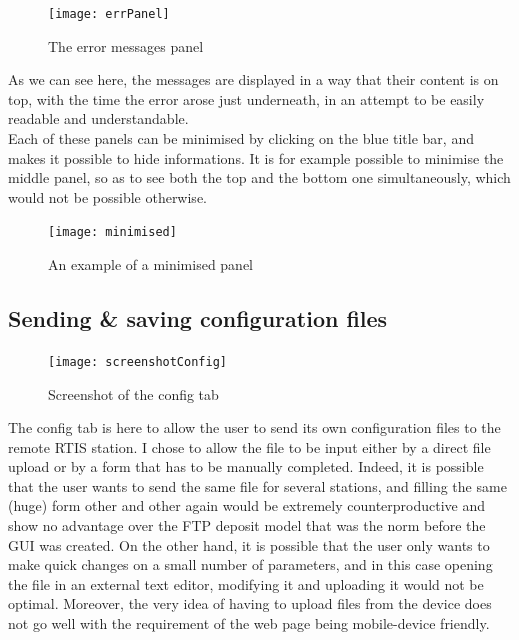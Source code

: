 \documentclass{themeensg}
\begin{document}
\begin{figure}[ht]
	\centering
	\texttt{[image: errPanel]}
	\caption{The error messages panel}
\end{figure}

As we can see here, the messages are displayed in a way that their content is on top, with the time the error arose just underneath, in an attempt to be easily readable and understandable.\\

Each of these panels can be minimised by clicking on the blue title bar, and makes it possible to hide informations. It is for example possible to minimise the middle panel, so as to see both the top and the bottom one simultaneously, which would not be possible otherwise.\\

\begin{figure}[hb]
	\centering
	\texttt{[image: minimised]}
	\caption{An example of a minimised panel}
\end{figure}


\newpage
\subsection{Sending \& saving configuration files}

\begin{figure}[ht]
	\centering
	\texttt{[image: screenshotConfig]}
	\caption{Screenshot of the config tab}
\end{figure}


The config tab is here to allow the user to send its own configuration files to the remote RTIS station. I chose to allow the file to be input either by a direct file upload or by a form that has to be manually completed. Indeed, it is possible that the user wants to send the same file for several stations, and filling the same (huge) form other and other again would be extremely counterproductive and show no advantage over the FTP deposit model that was the norm before the GUI was created. On the other hand, it is possible that the user only wants to make quick changes on a small number of parameters, and in this case opening the file in an external text editor, modifying it and uploading it would not be optimal. Moreover, the very idea of having to upload files from the device does not go well with the requirement of the web page being mobile-device friendly.\\
\end{document}
